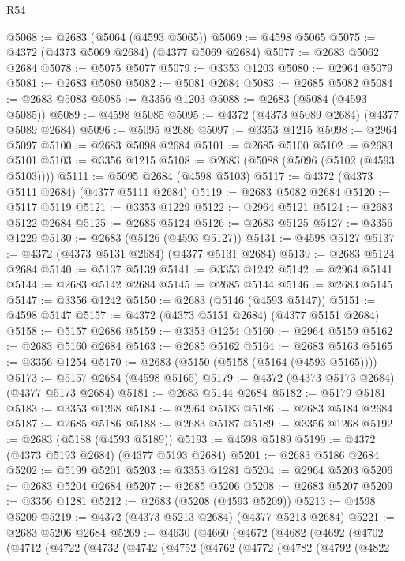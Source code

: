 \begin{lexlean}{R54}
\begin{coremodule}
@5068 := @2683 (@5064 (@4593 @5065))
@5069 := @4598 @5065
@5075 := @4372 (@4373 @5069 @2684) (@4377 @5069 @2684)
@5077 := @2683 @5062 @2684
@5078 := @5075 @5077
@5079 := @3353 @1203
@5080 := @2964 @5079
@5081 := @2683 @5080
@5082 := @5081 @2684
@5083 := @2685 @5082
@5084 := @2683 @5083
@5085 := @3356 @1203
@5088 := @2683 (@5084 (@4593 @5085))
@5089 := @4598 @5085
@5095 := @4372 (@4373 @5089 @2684) (@4377 @5089 @2684)
@5096 := @5095 @2686
@5097 := @3353 @1215
@5098 := @2964 @5097
@5100 := @2683 @5098 @2684
@5101 := @2685 @5100
@5102 := @2683 @5101
@5103 := @3356 @1215
@5108 := @2683 (@5088 (@5096 (@5102 (@4593 @5103))))
@5111 := @5095 @2684 (@4598 @5103)
@5117 := @4372 (@4373 @5111 @2684) (@4377 @5111 @2684)
@5119 := @2683 @5082 @2684
@5120 := @5117 @5119
@5121 := @3353 @1229
@5122 := @2964 @5121
@5124 := @2683 @5122 @2684
@5125 := @2685 @5124
@5126 := @2683 @5125
@5127 := @3356 @1229
@5130 := @2683 (@5126 (@4593 @5127))
@5131 := @4598 @5127
@5137 := @4372 (@4373 @5131 @2684) (@4377 @5131 @2684)
@5139 := @2683 @5124 @2684
@5140 := @5137 @5139
@5141 := @3353 @1242
@5142 := @2964 @5141
@5144 := @2683 @5142 @2684
@5145 := @2685 @5144
@5146 := @2683 @5145
@5147 := @3356 @1242
@5150 := @2683 (@5146 (@4593 @5147))
@5151 := @4598 @5147
@5157 := @4372 (@4373 @5151 @2684) (@4377 @5151 @2684)
@5158 := @5157 @2686
@5159 := @3353 @1254
@5160 := @2964 @5159
@5162 := @2683 @5160 @2684
@5163 := @2685 @5162
@5164 := @2683 @5163
@5165 := @3356 @1254
@5170 := @2683 (@5150 (@5158 (@5164 (@4593 @5165))))
@5173 := @5157 @2684 (@4598 @5165)
@5179 := @4372 (@4373 @5173 @2684) (@4377 @5173 @2684)
@5181 := @2683 @5144 @2684
@5182 := @5179 @5181
@5183 := @3353 @1268
@5184 := @2964 @5183
@5186 := @2683 @5184 @2684
@5187 := @2685 @5186
@5188 := @2683 @5187
@5189 := @3356 @1268
@5192 := @2683 (@5188 (@4593 @5189))
@5193 := @4598 @5189
@5199 := @4372 (@4373 @5193 @2684) (@4377 @5193 @2684)
@5201 := @2683 @5186 @2684
@5202 := @5199 @5201
@5203 := @3353 @1281
@5204 := @2964 @5203
@5206 := @2683 @5204 @2684
@5207 := @2685 @5206
@5208 := @2683 @5207
@5209 := @3356 @1281
@5212 := @2683 (@5208 (@4593 @5209))
@5213 := @4598 @5209
@5219 := @4372 (@4373 @5213 @2684) (@4377 @5213 @2684)
@5221 := @2683 @5206 @2684
@5269 := @4630
    (@4660
      (@4672
        (@4682
          (@4692
            (@4702
              (@4712
                (@4722
                  (@4732
                    (@4742
                      (@4752
                        (@4762
                          (@4772
                            (@4782
                              (@4792
                                (@4822

\end{coremodule}
\end{lexlean}
